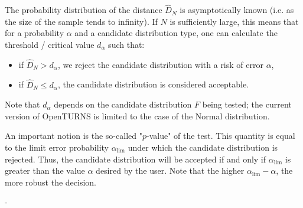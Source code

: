{  The probability distribution of the distance $\widehat{D}_N$ is asymptotically known (i.e. as the size of the sample tends to infinity). If $N$ is sufficiently large, this means that for a probability $\alpha$ and a candidate distribution type, one can calculate the threshold / critical value $d_\alpha$ such that:
  \begin{itemize}
  \item if  $\widehat{D}_N>d_{\alpha}$, we reject the candidate distribution with a risk of error $\alpha$,
  \item if  $\widehat{D}_N \leq d_{\alpha}$, the candidate distribution is considered acceptable.
  \end{itemize}
  Note that $d_\alpha$ depends on the candidate distribution $F$ being tested; the current version of OpenTURNS is limited to the case of the Normal distribution.

  An important notion is the so-called "$p$-value" of the test. This quantity is equal to the limit error probability $\alpha_\textrm{lim}$ under which the candidate distribution is rejected. Thus, the candidate distribution will be accepted if and only if $\alpha_\textrm{lim}$ is greater than the value $\alpha$ desired by the user. Note that the higher $\alpha_\textrm{lim} - \alpha$, the more robust the decision.
}
{
  -
}



